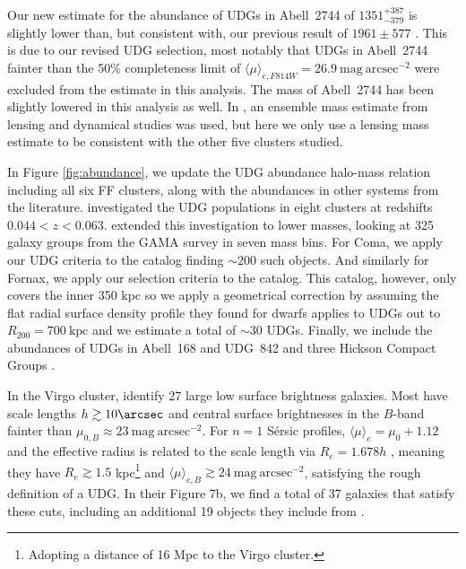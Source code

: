 \documentclass[iop,tighten,twocolumn,apj,floatfix]{emulateapj}
\begin{document}
Our new estimate for the abundance of UDGs in Abell~2744 of
$1351^{+387}_{-379}$ is slightly lower than, but consistent with, our previous
result of $1961 \pm 577$ \citep{janssens2017}. This is due to our revised UDG
selection, most notably that UDGs in Abell~2744 fainter than the 50\%
completeness limit of
$\langle\mu\rangle_{e,F814W} = 26.9~\mathrm{mag}~\mathrm{arcsec}^{-2}$
were excluded from the estimate in this analysis.
The mass of Abell~2744 has been slightly lowered in this analysis as well. In
\cite{janssens2017}, an ensemble mass estimate from lensing and dynamical
studies was used, but here we only use a lensing mass estimate to be
consistent with the other five clusters studied.

In Figure \ref{fig:abundance}, we update the UDG abundance halo-mass relation
including all six FF clusters, along with the abundances in other systems from
the literature.
\cite{vdb2016} investigated the UDG populations in eight clusters at
redshifts $0.044 < z < 0.063$.
\cite{vdb2017} extended this investigation to lower masses, looking at 325
galaxy groups from the GAMA survey in seven mass bins.
For Coma, we apply our UDG criteria to the \cite{yagi2016}
catalog finding ${\sim}200$ such objects.
And similarly for Fornax, we apply our selection criteria to the
\cite{munoz2015} catalog. This catalog, however, only covers the inner 350 kpc
so we apply a geometrical correction by assuming the flat radial surface
density profile they found for dwarfs applies to UDGs out to $R_{200} =
700~\mathrm{kpc}$ \citep{drinkwater2001} and we estimate a total of ${\sim}30$
UDGs.
Finally, we include the abundances of UDGs in Abell~168 and UDG~842
\citep{roman2017a} and three Hickson Compact Groups \citep{roman2017b}.

In the Virgo cluster, \cite{impey1988} identify 27 large low surface
brightness galaxies.
Most have scale lengths $h \gtrsim 10\arcsec$ and central surface
brightnesses in the $B$-band fainter than $\mu_{0,B} \approx
23~\mathrm{mag}~\mathrm{arcsec}^{-2}$.
For $n=1$ S\'{e}rsic profiles, $\langle\mu\rangle_e = \mu_0 + 1.12$ and the
effective radius is related to the scale length via $R_e = 1.678h$
\citep{graham2005}, meaning they have $R_e \gtrsim 1.5$ kpc\footnote{Adopting
a distance of 16 Mpc to the Virgo cluster.} and
$\langle\mu\rangle_{e,B} \gtrsim 24~\mathrm{mag}~\mathrm{arcsec}^{-2}$,
satisfying the rough definition of a UDG.
In their Figure 7b, we find a total of 37 galaxies that satisfy these cuts,
including an additional 19 objects they include from \cite{caldwell1983}.
\end{document}
